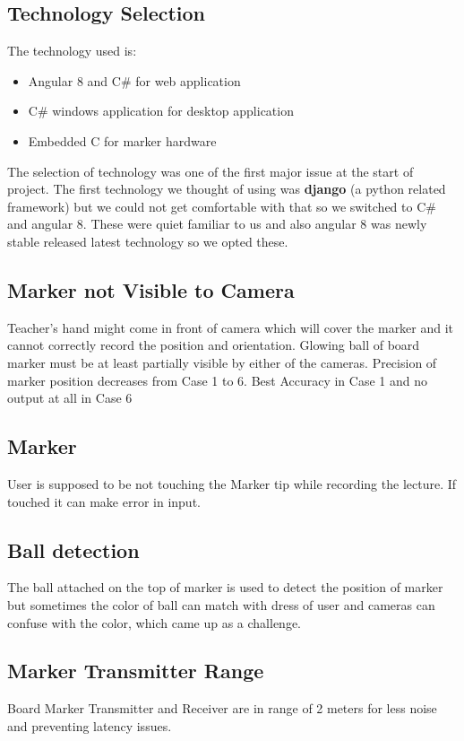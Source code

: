 \subsection{Technology Selection}
The technology used is:
\begin{itemize}

\item Angular 8 and C\# for web application
\item C\# windows application for desktop application
\item Embedded C for marker hardware

\end{itemize}

The selection of technology was one of the first major issue at the start of project. The first technology we thought of using was \textbf{django} (a python related framework) but we could not get comfortable with that so we switched to C\# and angular 8. These were quiet familiar to us and also angular 8 was newly stable released latest technology so we opted these.
\bigskip


\subsection{Marker not Visible to Camera}
Teacher's hand might come in front of camera which will cover the marker and it cannot correctly record the position and orientation. Glowing ball of board marker must be at least partially visible by either of the cameras. Precision of marker position decreases from Case 1 to 6. Best Accuracy in Case 1 and no output at all in Case 6
\bigskip

\subsection{Marker}
User is supposed to be not touching the Marker tip while recording the lecture. If touched it can make error in input.
\bigskip

\subsection{Ball detection}
The ball attached on the top of marker is used to detect the position of marker but sometimes the color of ball can match with dress of user and cameras can confuse with the color, which came up as a challenge.
\bigskip

\subsection{Marker Transmitter Range}
Board Marker Transmitter and Receiver are in range of 2 meters for less noise and preventing latency issues.
\bigskip

